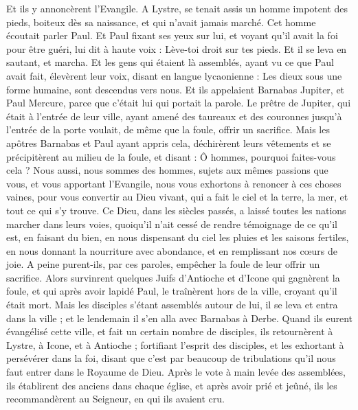 \begin{multicols}{2}
{{Et ils y annoncèrent l'Evangile.
A Lystre, se tenait assis un homme impotent des pieds, boiteux dès sa naissance, et qui n'avait jamais marché.
Cet homme écoutait parler Paul. Et Paul fixant ses yeux sur lui, et voyant qu'il avait la foi pour être guéri,
lui dit à haute voix : Lève-toi droit sur tes pieds. Et il se leva en sautant, et marcha.
Et les gens qui étaient là assemblés, ayant vu ce que Paul avait fait, élevèrent leur voix, disant en langue lycaonienne : Les dieux sous une forme humaine, sont descendus vers nous.
Et ils appelaient Barnabas Jupiter, et Paul Mercure, parce que c'était lui qui portait la parole.
Le prêtre de Jupiter, qui était à l'entrée de leur ville, ayant amené des taureaux et des couronnes jusqu'à l'entrée de la porte voulait, de même que la foule, offrir un sacrifice.
Mais les apôtres Barnabas et Paul ayant appris cela, déchirèrent leurs vêtements et se précipitèrent au milieu de la foule,
et disant : Ô hommes, pourquoi faites-vous cela ? Nous aussi, nous sommes des hommes, sujets aux mêmes passions que vous, et vous apportant l'Evangile, nous vous exhortons à renoncer à ces choses vaines, pour vous convertir au Dieu vivant, qui a fait le ciel et la terre, la mer, et tout ce qui s'y trouve.
Ce Dieu, dans les siècles passés, a laissé toutes les nations marcher dans leurs voies,
quoiqu'il n'ait cessé de rendre témoignage de ce qu'il est, en faisant du bien, en nous dispensant du ciel les pluies et les saisons fertiles, en nous donnant la nourriture avec abondance, et en remplissant nos cœurs de joie.
A peine purent-ils, par ces paroles, empêcher la foule de leur offrir un sacrifice.
Alors survinrent quelques Juifs d'Antioche et d'Icone qui gagnèrent la foule, et qui après avoir lapidé Paul, le traînèrent hors de la ville, croyant qu'il était mort.
Mais les disciples s'étant assemblés autour de lui, il se leva et entra dans la ville ; et le lendemain il s'en alla avec Barnabas à Derbe.
Quand ils eurent évangélisé cette ville, et fait un certain nombre de disciples, ils retournèrent à Lystre, à Icone, et à Antioche ;
fortifiant l'esprit des disciples, et les exhortant à persévérer dans la foi, disant que c'est par beaucoup de tribulations qu'il nous faut entrer dans le Royaume de Dieu.
Après le vote à main levée des assemblées, ils établirent des anciens dans chaque église, et après avoir prié et jeûné, ils les recommandèrent au Seigneur, en qui ils avaient cru.
}}
\end{multicols}
